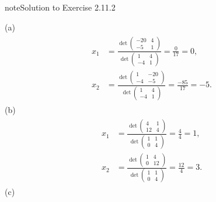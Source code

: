 \documentclass[letterpaper,10pt,english]{jupyterBook}
\begin{document}
\begin{sphinxadmonition}{note}{Solution to Exercise 2.11.2}



\sphinxAtStartPar
(a)
\begin{equation*}
\begin{split} \begin{align*} 
    x_{1} &= \frac{\det\left(\begin{matrix}-20 & 4\\-5 & 1\end{matrix}\right)}{\det\left(\begin{matrix}1 & 4\\-4 & 1\end{matrix}\right)} 
    = \frac{0}{17} = 0, \\ 
    x_{2} &= \frac{\det\left(\begin{matrix}1 & -20\\-4 & -5\end{matrix}\right)}{\det\left(\begin{matrix}1 & 4\\-4 & 1\end{matrix}\right)} 
    = \frac{-85}{17} = -5. 
\end{align*} \end{split}
\end{equation*}
\sphinxAtStartPar
(b)
\begin{equation*}
\begin{split} \begin{align*} 
    x_{1} &= \frac{\det\left(\begin{matrix}4 & 1\\12 & 4\end{matrix}\right)}{\det\left(\begin{matrix}1 & 1\\0 & 4\end{matrix}\right)} 
    = \frac{4}{4} = 1, \\ 
    x_{2} &= \frac{\det\left(\begin{matrix}1 & 4\\0 & 12\end{matrix}\right)}{\det\left(\begin{matrix}1 & 1\\0 & 4\end{matrix}\right)} 
    = \frac{12}{4} = 3. 
\end{align*} \end{split}
\end{equation*}
\sphinxAtStartPar
(c)

\end{sphinxadmonition}
\end{document}
